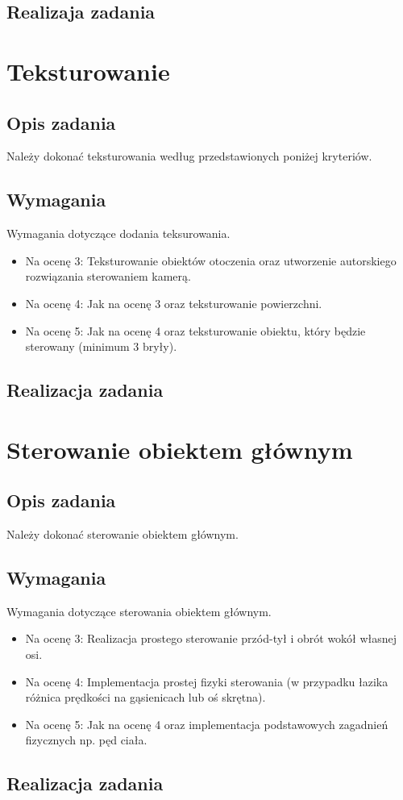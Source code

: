 \documentclass[a4paper, 12pt]{report}
\begin{document}
\section{Realizaja zadania}

\chapter{Teksturowanie}
\section{Opis zadania}

Należy dokonać teksturowania według przedstawionych poniżej kryteriów.
\section{Wymagania}

Wymagania dotyczące dodania teksurowania.
\begin{itemize}
\item Na ocenę 3: Teksturowanie obiektów otoczenia oraz utworzenie autorskiego rozwiązania sterowaniem kamerą.
\item Na ocenę 4: Jak na ocenę 3 oraz teksturowanie powierzchni.
\item Na ocenę 5: Jak na ocenę 4 oraz teksturowanie obiektu, który będzie sterowany (minimum 3 bryły).
\end{itemize}
\section{Realizacja zadania}

\chapter{Sterowanie obiektem głównym}
\section{Opis zadania}
Należy dokonać sterowanie obiektem głównym.
\section{Wymagania}
Wymagania dotyczące sterowania obiektem głównym.
\begin{itemize}
\item Na ocenę 3: Realizacja prostego sterowanie przód-tył i obrót wokół własnej osi.
\item Na ocenę 4: Implementacja prostej fizyki sterowania (w przypadku łazika różnica prędkości na gąsienicach lub oś skrętna).
\item Na ocenę 5: Jak na ocenę 4 oraz implementacja podstawowych zagadnień fizycznych np. pęd ciała.
\end{itemize}
\section{Realizacja zadania}
\end{document}
